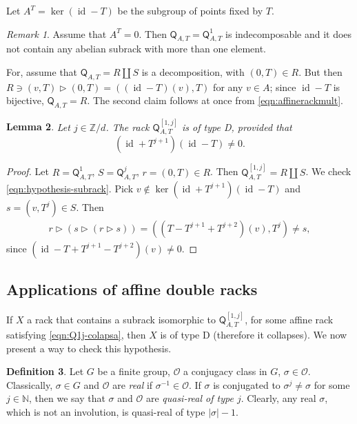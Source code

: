 \documentclass[11pt]{amsart} \textheight 22cm
\renewcommand{\^}[1]{\mbox{$^{\left( #1 \right)}$}}
\renewcommand{\_}[1]{\mbox{$_{\left( #1 \right)}$}}
\newcommand{\trid}{\triangleright}
\newcommand{\Z}{{\mathbb Z}}
\newcommand{\N}{{\mathbb N}}
\newcommand{\Q}{{\mathsf Q}}
\newcommand{\Oc}{{\mathcal O}}
\newcommand{\oc}{{\mathcal O}}
\theoremstyle{plain}
\newtheorem{lema}{Lemma}[section]
\theoremstyle{definition}
\newtheorem{definition}[lema]{Definition}
\theoremstyle{remark}
\newtheorem{obs}[lema]{Remark}
\newcommand\id{\operatorname{id}}
\def\pf{\begin{proof}}
\def\epf{\end{proof}}
\theoremstyle{remark}
\begin{document}
Let $A^T = \ker (\id - T)$ be the subgroup of points fixed by $T$.

\begin{obs}\label{obs:sin-invariantes} Assume that $A^T = 0$. Then $\Q_{A,T} = \Q^1_{A,T}$ is indecomposable
and it does not contain any abelian subrack with more than one
element.
\end{obs}

For, assume that $\Q_{A,T} = R\coprod S$ is a decomposition, with
$(0,T)\in R$. But then $R\ni (v,T)\trid (0,T) = ((\id - T)(v), T)$
for any $v\in A$; since $\id - T$ is bijective, $\Q_{A,T} = R$.
The second claim follows at once from \eqref{eqn:affinerackmult}.


\begin{lema}\label{lema:dobleafincero}
    Let $j\in \Z/d$.
\renewcommand{\theenumi}{\alph{enumi}}\renewcommand{\labelenumi}{(\theenumi)}
The rack $\Q_{A,T}^{[1,j]}$ is of type D,
        provided that
 \begin{equation}\label{eqn:Q1j-colapsa}
        (\id+T^{j+1})(\id-T)\neq 0.
    \end{equation}

\end{lema}

\pf Let $R=\Q_{A,T}^1$, $S=\Q_{A,T}^j$, $r=(0,T)\in R$. Then
$\Q_{A,T}^{[1,j]}=R\coprod S$.
We check
\eqref{eqn:hypothesis-subrack}.  Pick $v\notin \ker
(\id+T^{j+1})(\id-T)$ and $s=(v,T^j)\in S$. Then
\begin{align*}
    r\trid( s \trid ( r\trid s))=((T-T^{j+1}+T^{j+2})(v), T^j)\neq s,
\end{align*}
since $(\id-T+T^{j+1}-T^{j+2})(v)\neq 0$.
\epf






\medbreak\subsection{Applications of affine double
racks}\label{subsec:affines-appl}


If $X$ a rack that contains a subrack isomorphic to
$\Q_{A,T}^{[1,j]}$, for some affine rack satisfying
\eqref{eqn:Q1j-colapsa}, then $X$ is of type D (therefore it
collapses). We now present a way to check this hypothesis.




\begin{definition}
    Let $G$ be a finite group, $\oc$ a conjugacy class in $G$, $\sigma\in \Oc$.
    Classically, $\sigma\in G$ and $\oc$ are \emph{real} if $\sigma^{-1}\in \Oc$.
    If $\sigma$ is conjugated to $\sigma^{j}\neq \sigma$ for some
    $j\in\N$, then we say that $\sigma$ and $\oc$ are \emph{quasi-real of type
    $j$}. Clearly, any real $\sigma$, which is not an involution, is quasi-real of type
    $\vert\sigma\vert - 1$.
\end{definition}
\end{document}
